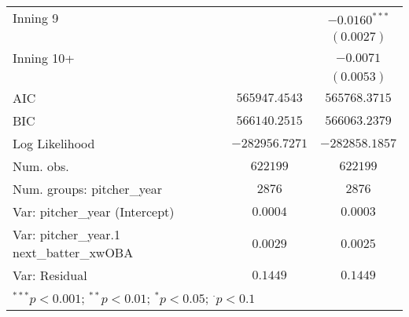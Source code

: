 \begin{tabular}{l c c}
Inning 9                                 &                 & $-0.0160^{***}$   \\
                                         &                 & $(0.0027)$        \\
Inning 10+                               &                 & $-0.0071$         \\
                                         &                 & $(0.0053)$        \\
\midrule
AIC                                      & $565947.4543$   & $565768.3715$     \\
BIC                                      & $566140.2515$   & $566063.2379$     \\
Log Likelihood                           & $-282956.7271$  & $-282858.1857$    \\
Num. obs.                                & $622199$        & $622199$          \\
Num. groups: pitcher\_year               & $2876$          & $2876$            \\
Var: pitcher\_year (Intercept)           & $0.0004$        & $0.0003$          \\
Var: pitcher\_year.1 next\_batter\_xwOBA & $0.0029$        & $0.0025$          \\
Var: Residual                            & $0.1449$        & $0.1449$          \\
\bottomrule
\multicolumn{3}{l}{\scriptsize{$^{***}p<0.001$; $^{**}p<0.01$; $^{*}p<0.05$; $^{\cdot}p<0.1$}}
\end{tabular}

